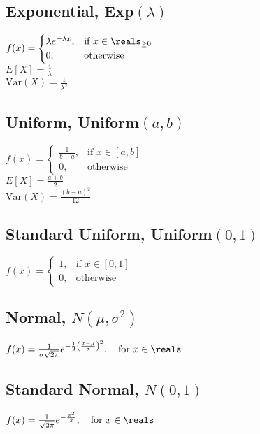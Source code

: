 \subsection*{Exponential, \textnormal{Exp}\((\lambda)\)}
\(
  f(x) =
  \begin{cases}
    \lambda e^{-\lambda x}, & \text{if } x \in \reals_{\ge 0}\\
    0, & \text{otherwise}
  \end{cases}
\)\\
\(E[X] = \frac{1}{\lambda}\)\\
\(\text{Var}(X) = \frac{1}{\lambda^2}\)

\subsection*{Uniform, \textnormal{Uniform}\((a, b)\)}
\(
  f(x) =
  \begin{cases}
    \frac{1}{b-a}, & \text{if } x \in [a, b]\\
    0, & \text{otherwise}
  \end{cases}
\)\\
\(E[X] = \frac{a+b}{2}\)\\
\(\text{Var}(X) = \frac{(b-a)^2}{12}\)

\subsection*{Standard Uniform, \textnormal{Uniform}\((0, 1)\)}
\(
  f(x) =
  \begin{cases}
    1, & \text{if } x \in [0, 1]\\
    0, & \text{otherwise}
  \end{cases}
\)

\subsection*{Normal, \(N(\mu, \sigma^2)\)}
\(f(x) = \frac{1}{\sigma\sqrt{2\pi}}
  e^{-\frac{1}{2}\left(\frac{x-\mu}{\sigma}\right)^2},
  \quad \text{for } x \in \reals
\)

\subsection*{Standard Normal, \(N(0, 1)\)}
\(
  f(x) = \frac{1}{\sqrt{2\pi}} e^{-\frac{x^2}{2}},
  \quad \text{for } x \in \reals
\)

